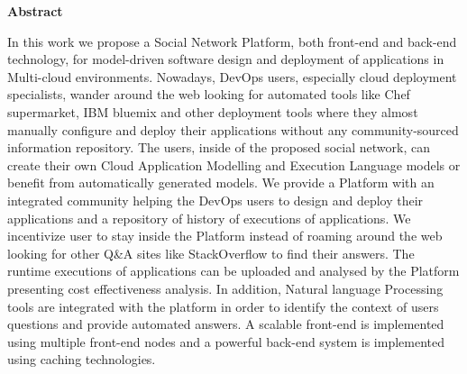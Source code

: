 \thispagestyle{empty}
\begin{titlepage}
\begin{center}
{\bf\Large Abstract}\\
\end{center}

\indent In this work we propose a Social Network Platform, both front-end and back-end technology, for model-driven software design and deployment of applications in Multi-cloud environments. Nowadays, DevOps users, especially cloud deployment specialists, wander around the web looking for automated tools like Chef supermarket, IBM bluemix and other deployment tools where they almost manually configure and deploy their applications without any community-sourced information repository. The users, inside of the proposed social network, can create their own Cloud Application Modelling and Execution
Language models or benefit from automatically generated models. We provide a Platform with an integrated community helping the DevOps users to design and deploy their applications and a repository of history of executions of applications. We incentivize user to stay inside the Platform instead of roaming around the web looking for other Q\&A sites like StackOverflow to find their answers. The runtime executions of applications can be uploaded and analysed by the Platform presenting cost effectiveness analysis. In addition, Natural language Processing tools are integrated with the platform in order to identify the context of users questions and provide automated answers. A scalable front-end is implemented using multiple front-end nodes and a powerful back-end system is implemented using caching technologies. 


\vfill
\end{titlepage}

